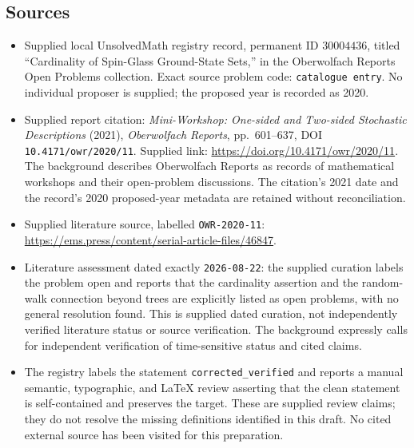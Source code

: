 \documentclass[11pt]{article}
\begin{document}
\subsection{Sources}
\begin{itemize}
\item Supplied local UnsolvedMath registry record, permanent ID \(30004436\), titled ``Cardinality of Spin-Glass Ground-State Sets,'' in the Oberwolfach Reports Open Problems collection. Exact source problem code: \texttt{catalogue entry}. No individual proposer is supplied; the proposed year is recorded as 2020.
\item Supplied report citation: \emph{Mini-Workshop: One-sided and Two-sided Stochastic Descriptions} (2021), \emph{Oberwolfach Reports}, pp.~601--637, DOI \texttt{10.4171/owr/2020/11}. Supplied link: \url{https://doi.org/10.4171/owr/2020/11}. The background describes Oberwolfach Reports as records of mathematical workshops and their open-problem discussions. The citation's 2021 date and the record's 2020 proposed-year metadata are retained without reconciliation.
\item Supplied literature source, labelled \texttt{OWR-2020-11}: \url{https://ems.press/content/serial-article-files/46847}.
\item Literature assessment dated exactly \texttt{2026-08-22}: the supplied curation labels the problem open and reports that the cardinality assertion and the random-walk connection beyond trees are explicitly listed as open problems, with no general resolution found. This is supplied dated curation, not independently verified literature status or source verification. The background expressly calls for independent verification of time-sensitive status and cited claims.
\item The registry labels the statement \texttt{corrected\_verified} and reports a manual semantic, typographic, and LaTeX review asserting that the clean statement is self-contained and preserves the target. These are supplied review claims; they do not resolve the missing definitions identified in this draft. No cited external source has been visited for this preparation.
\end{itemize}
\end{document}
